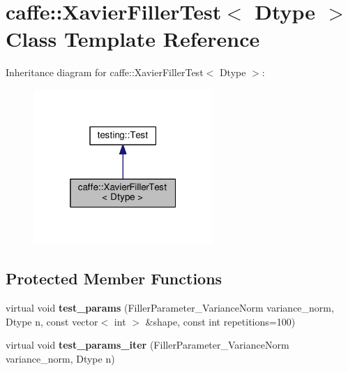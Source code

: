 \hypertarget{classcaffe_1_1_xavier_filler_test}{}\section{caffe\+:\+:Xavier\+Filler\+Test$<$ Dtype $>$ Class Template Reference}
\label{classcaffe_1_1_xavier_filler_test}


Inheritance diagram for caffe\+:\+:Xavier\+Filler\+Test$<$ Dtype $>$\+:
\nopagebreak
\begin{figure}[H]
\begin{center}
\leavevmode
\includegraphics[width=193pt]{classcaffe_1_1_xavier_filler_test__inherit__graph}
\end{center}
\end{figure}
\subsection*{Protected Member Functions}
\begin{DoxyCompactItemize}
\item 
\mbox{\label{classcaffe_1_1_xavier_filler_test_aa2a607a5566feece689730cdfefffafc}} 
virtual void {\bfseries test\+\_\+params} (Filler\+Parameter\+\_\+\+Variance\+Norm variance\+\_\+norm, Dtype n, const vector$<$ int $>$ \&shape, const int repetitions=100)
\item 
\mbox{\label{classcaffe_1_1_xavier_filler_test_ad27f425b58580108a4791de4c18f2414}} 
virtual void {\bfseries test\+\_\+params\+\_\+iter} (Filler\+Parameter\+\_\+\+Variance\+Norm variance\+\_\+norm, Dtype n)
\end{DoxyCompactItemize}
